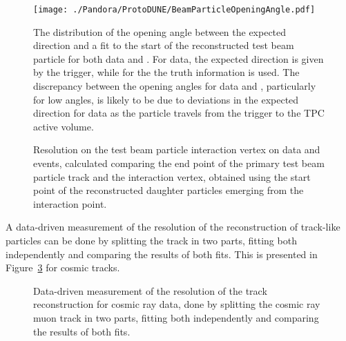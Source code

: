 \begin{figure}[!ht]
\centering
\texttt{[image: ./Pandora/ProtoDUNE/BeamParticleOpeningAngle.pdf]}
\caption[distribution of opening angle between expected direction and fit to reconstructed test beam particle, data and ]{The distribution of the opening angle between the expected direction and a fit to the start of the reconstructed test beam particle for both data and .  For data, the expected direction is given by the trigger, while for the  the truth information is used.  The discrepancy between the opening angles for data and , particularly for low angles, is likely to be due to deviations in the expected direction for data as the particle travels from the trigger to the TPC active volume.}
\label{fig:pandora_protodune_openingangle}
\end{figure}



\begin{figure}[!ht]
\centering
\caption{Resolution on the test beam particle interaction vertex on  data and  events, calculated comparing the end point of the primary test beam particle track and the interaction vertex, obtained using the start point of the reconstructed daughter particles emerging from the interaction point.}
\label{fig:pandora_protodune_vertex}
\end{figure}

 A data-driven measurement of the resolution of the reconstruction of track-like particles can be done by splitting the track in two parts, fitting both independently and comparing the results of both fits. This is presented in Figure~\ref{fig:pandora_protodune_trackres} for  cosmic tracks.
 
\begin{figure}[!ht]
\centering
\caption[Data-driven resolution measurement of the track reconstruction for  cosmic ray data]{Data-driven measurement of the resolution of the track reconstruction for  cosmic ray data, done by splitting the cosmic ray muon track in two parts, fitting both independently and comparing the results of both fits.}
\label{fig:pandora_protodune_trackres}
\end{figure}

